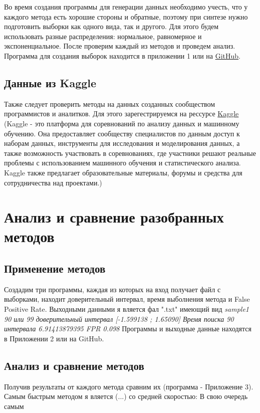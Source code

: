 \documentclass[specialist,
               substylefile = spbu_report.rtx,
               subf,href,colorlinks=true, 12pt]{disser}
\begin{document}
    Во время создания программы для генерации данных необходимо учесть, что у каждого метода есть хорошие стороны и обратные, поэтому при синтезе нужно подготовить выборки как одного вида, так и другого. Для этого будем использовать разные распределения: нормальное, равномерное и экспоненциальное. После проверим каждый из методов и проведем анализ.
    Программа для создания выборок находится в приложении 1 или на \href{https://github.com/krivonosovti/QuantileCIComparison/blob/main/DataFactory.py}{GitHub}.
    
\subsection{Данные из Kaggle}
    Также следует проверить методы на данных созданных сообществом программистов и аналитков. Для этого зарегестрируемся на рессурсе \href{https://www.kaggle.com}{Kaggle} (Kaggle - это платформа для соревнований по анализу данных и машинному обучению. Она предоставляет сообществу специалистов по данным доступ к наборам данных, инструменты для исследования и моделирования данных, а также возможность участвовать в соревнованиях, где участники решают реальные проблемы с использованием машинного обучения и статистического анализа. Kaggle также предлагает образовательные материалы, форумы и средства для сотрудничества над проектами.)



\newpage
\section{Анализ и сравнение разобранных методов}
    \subsection{Применение методов}
        Создадим три программы, каждая из которых на вход получает файл с выборками, находит доверительный интервал, время выболнения метода и False Positive Rate. Выходными данными я вляется фал ".txt" имеющий вид
       \newline
      \textit{sample1 90 или 99 доверительный интервал [-1.599138 ; 1.65090] Время поиска 90 интервала  6.91413879395 FPR 0.098}
        Программы и выходные данные находятся в Приложении 2 или на GitHub.
    \subsection{Анализ и сравнение методов}
    Получив результаты от каждого метода сравним их (программа - Приложение 3).
    Самым быстрым методом я вляется (...) со средней скоростью:
    В свою очередь самым 
\end{document}
